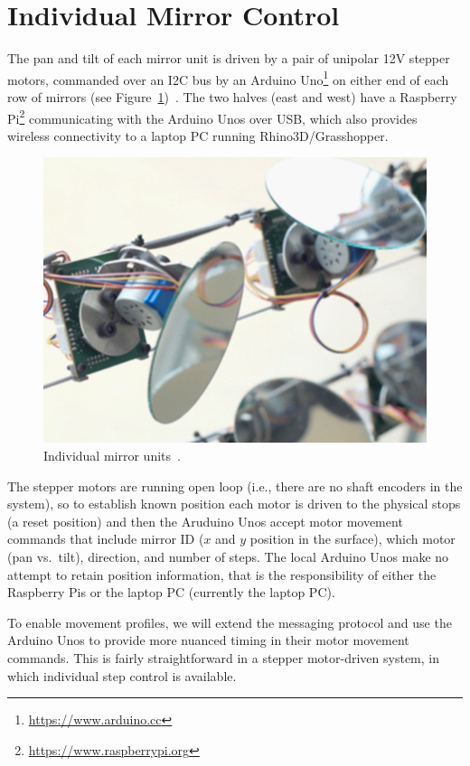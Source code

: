 \section{Individual Mirror Control}
\label{sec:mirror}

The pan and tilt of each mirror unit is driven by a pair of
unipolar 12V stepper motors, commanded over an I2C bus by an
Arduino Uno\footnote{\url{https://www.arduino.cc}} on either end of
each row of mirrors (see Figure~\ref{fig:mirror})~\cite{acadia18}.
The two halves (east and west) have a
Raspberry Pi\footnote{\url{https://www.raspberrypi.org}}
communicating with the Arduino Unos over USB, which also provides
wireless connectivity to a laptop PC running Rhino3D/Grasshopper.

\begin{figure}[ht]
\includegraphics[width=0.6\columnwidth]{mirror}
\caption{Individual mirror units~\protect\cite{acadia18}.}
\label{fig:mirror}
\end{figure}

The stepper motors are running open loop (i.e., there are no
shaft encoders in the system), so to establish known position each
motor is driven to the physical stops (a reset position) and then
the Aruduino Unos accept motor movement commands that include
mirror ID ($x$ and $y$ position in the surface), which motor (pan vs.\ tilt),
direction, and number of steps. The local Arduino Unos make no
attempt to retain position information, that is the responsibility
of either the Raspberry Pis or the laptop PC (currently the laptop PC).

To enable movement profiles, we will extend the messaging protocol
and use the Arduino Unos to provide more nuanced timing in their
motor movement commands. This is fairly straightforward in a stepper
motor-driven system, in which individual step control is available.
